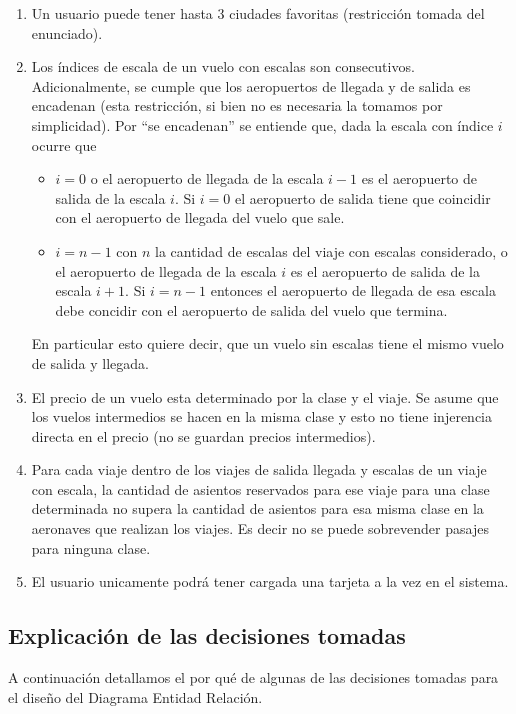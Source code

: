 \begin{enumerate}
	\item Un usuario puede tener hasta 3 ciudades favoritas (restricci\'on tomada del enunciado).
	\item Los \'indices de escala de un vuelo con escalas son consecutivos. Adicionalmente, se cumple
	que los aeropuertos de llegada y de salida es encadenan (esta restricci\'on, si bien no es necesaria
	la tomamos por simplicidad). Por ``se encadenan'' se entiende que, dada la escala con \'indice $i$
	ocurre que
	
	\begin{itemize}
		\item $i = 0$ o el aeropuerto de llegada de la escala $i-1$ es el aeropuerto de salida de
		la escala $i$. Si $i = 0$ el aeropuerto de salida tiene que coincidir con el aeropuerto de llegada
		del vuelo que sale.
		\item $i = n-1$ con $n$ la cantidad de escalas del viaje con escalas considerado, o el aeropuerto
		de llegada de la escala $i$ es el aeropuerto de salida de la escala $i+1$. Si $i = n-1$ entonces
		el aeropuerto de llegada de esa escala debe concidir con el aeropuerto de salida del vuelo que termina.
	\end{itemize}

	En particular esto quiere decir, que un vuelo sin escalas tiene el mismo vuelo de salida y llegada.
	
	\item El precio de un vuelo esta determinado por la clase y el viaje. Se asume que los vuelos
	intermedios se hacen en la misma clase y esto no tiene injerencia directa en el precio (no se guardan precios intermedios).
	\item Para cada viaje dentro de los viajes de salida llegada y escalas de un viaje con escala, la cantidad de asientos 
	reservados para ese viaje para una clase determinada no supera la cantidad de asientos para esa misma clase en la aeronaves
	que realizan los viajes. Es decir no se puede sobrevender pasajes para ninguna clase.
    \item El usuario unicamente podr\'a tener cargada una tarjeta a la vez en el sistema.
\end{enumerate}

\subsection{Explicaci\'on de las decisiones tomadas}

A continuaci\'on detallamos el por qu\'e de algunas de las decisiones tomadas para el diseño del Diagrama Entidad Relaci\'on.

